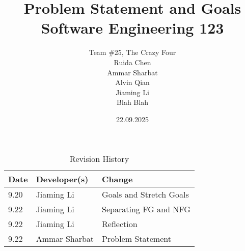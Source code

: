 \documentclass{article}
\title{Problem Statement and Goals\\\SE Software Engineering 123}
\author{
    Team \#25, The Crazy Four \\[1ex]
    Ruida Chen \\
    Ammar Sharbat \\
    Alvin Qian \\
    Jiaming Li \\
    Blah Blah
}
\date{22.09.2025}
\begin{document}
    \maketitle

    \begin{table}[hp]
        \caption{Revision History} \label{TblRevisionHistory}
        \begin{tabularx}{\textwidth}{llX}
            \toprule
            \textbf{Date} & \textbf{Developer(s)} & \textbf{Change}\\
            \midrule
            9.20 & Jiaming Li & Goals and Stretch Goals\\
            9.22 & Jiaming Li & Separating FG and NFG\\
            9.22 & Jiaming Li & Reflection\\
            9.22 & Ammar Sharbat & Problem Statement\\
            \bottomrule
        \end{tabularx}
    \end{table}
\end{document}
